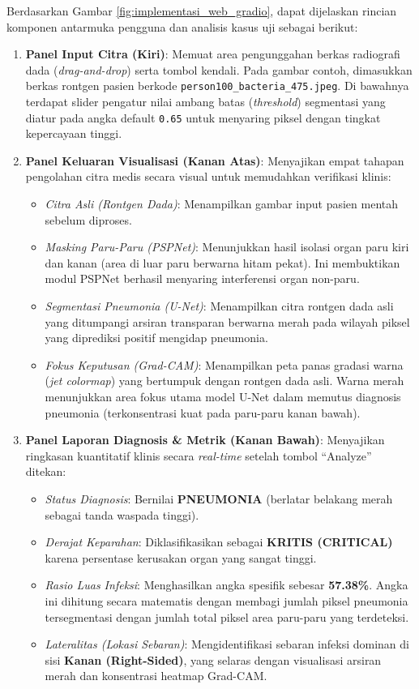 \documentclass[12pt,a4paper,oneside]{book}
\begin{document}
Berdasarkan Gambar \ref{fig:implementasi_web_gradio}, dapat dijelaskan rincian komponen antarmuka pengguna dan analisis kasus uji sebagai berikut:
\begin{enumerate}
  \item \textbf{Panel Input Citra (Kiri)}: Memuat area pengunggahan berkas radiografi dada (\textit{drag-and-drop}) serta tombol kendali. Pada gambar contoh, dimasukkan berkas rontgen pasien berkode \texttt{person100\_bacteria\_475.jpeg}. Di bawahnya terdapat slider pengatur nilai ambang batas (\textit{threshold}) segmentasi yang diatur pada angka default \texttt{0.65} untuk menyaring piksel dengan tingkat kepercayaan tinggi.
  \item \textbf{Panel Keluaran Visualisasi (Kanan Atas)}: Menyajikan empat tahapan pengolahan citra medis secara visual untuk memudahkan verifikasi klinis:
  \begin{itemize}
    \item \textit{Citra Asli (Rontgen Dada)}: Menampilkan gambar input pasien mentah sebelum diproses.
    \item \textit{Masking Paru-Paru (PSPNet)}: Menunjukkan hasil isolasi organ paru kiri dan kanan (area di luar paru berwarna hitam pekat). Ini membuktikan modul PSPNet berhasil menyaring interferensi organ non-paru.
    \item \textit{Segmentasi Pneumonia (U-Net)}: Menampilkan citra rontgen dada asli yang ditumpangi arsiran transparan berwarna merah pada wilayah piksel yang diprediksi positif mengidap pneumonia.
    \item \textit{Fokus Keputusan (Grad-CAM)}: Menampilkan peta panas gradasi warna (\textit{jet colormap}) yang bertumpuk dengan rontgen dada asli. Warna merah menunjukkan area fokus utama model U-Net dalam memutus diagnosis pneumonia (terkonsentrasi kuat pada paru-paru kanan bawah).
  \end{itemize}
  \item \textbf{Panel Laporan Diagnosis \& Metrik (Kanan Bawah)}: Menyajikan ringkasan kuantitatif klinis secara \textit{real-time} setelah tombol ``Analyze'' ditekan:
  \begin{itemize}
    \item \textit{Status Diagnosis}: Bernilai \textbf{PNEUMONIA} (berlatar belakang merah sebagai tanda waspada tinggi).
    \item \textit{Derajat Keparahan}: Diklasifikasikan sebagai \textbf{KRITIS (CRITICAL)} karena persentase kerusakan organ yang sangat tinggi.
    \item \textit{Rasio Luas Infeksi}: Menghasilkan angka spesifik sebesar \textbf{57.38\%}. Angka ini dihitung secara matematis dengan membagi jumlah piksel pneumonia tersegmentasi dengan jumlah total piksel area paru-paru yang terdeteksi.
    \item \textit{Lateralitas (Lokasi Sebaran)}: Mengidentifikasi sebaran infeksi dominan di sisi \textbf{Kanan (Right-Sided)}, yang selaras dengan visualisasi arsiran merah dan konsentrasi heatmap Grad-CAM.
  \end{itemize}
\end{enumerate}
\end{document}
